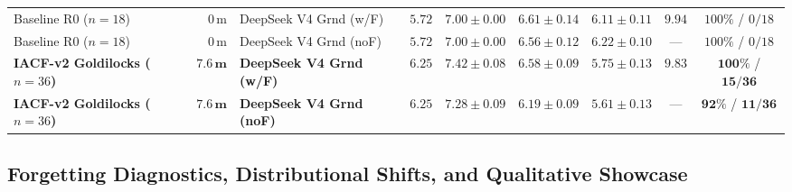 \documentclass[10.5pt,letterpaper]{article}
\begin{document}
\begin{table}[t]
{\begin{tabular}{@{}l r l c c c c c c@{}}
\midrule
Baseline R0 ($n\!=\!18$) & $0\,\text{m}$ & DeepSeek V4 Grnd (w/F) & $5.72$ & $7.00 \pm 0.00$ & $6.61 \pm 0.14$ & $6.11 \pm 0.11$ & $9.94$ & $100\%$ / $0/18$ \\
Baseline R0 ($n\!=\!18$) & $0\,\text{m}$ & DeepSeek V4 Grnd (noF) & $5.72$ & $7.00 \pm 0.00$ & $6.56 \pm 0.12$ & $6.22 \pm 0.10$ & --- & $100\%$ / $0/18$ \\
\rowcolor{softteal}
\textbf{IACF-v2 Goldilocks ($n\!=\!36$)} & $\mathbf{7.6\,\text{m}}$ & \textbf{DeepSeek V4 Grnd (w/F)} & $\mathbf{6.25}$ & $\mathbf{7.42 \pm 0.08}$ & $\mathbf{6.58 \pm 0.09}$ & $\mathbf{5.75 \pm 0.13}$ & $\mathbf{9.83}$ & $\mathbf{100\%}$ / $\mathbf{15/36}$ \\
\rowcolor{softteal}
\textbf{IACF-v2 Goldilocks ($n\!=\!36$)} & $\mathbf{7.6\,\text{m}}$ & \textbf{DeepSeek V4 Grnd (noF)} & $\mathbf{6.25}$ & $\mathbf{7.28 \pm 0.09}$ & $\mathbf{6.19 \pm 0.09}$ & $\mathbf{5.61 \pm 0.13}$ & --- & $\mathbf{92\%}$ / $\mathbf{11/36}$ \\
\bottomrule
\end{tabular}%
}
\end{table}

\subsection{Forgetting Diagnostics, Distributional Shifts, and Qualitative Showcase}
\end{document}
